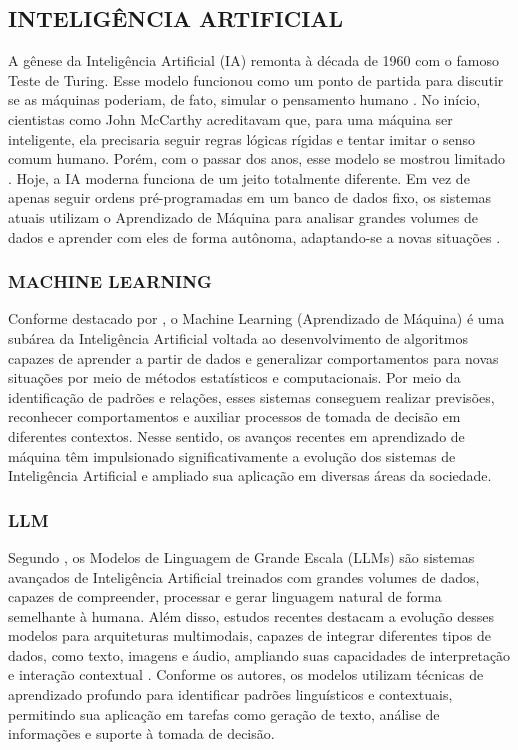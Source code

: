 \documentclass[12pt]{article}
\begin{document}
  \subsection{INTELIGÊNCIA ARTIFICIAL}
  
    A gênese da Inteligência Artificial (IA) remonta à década de 1960 com o famoso Teste de Turing. Esse modelo funcionou como um ponto de partida para discutir se as máquinas poderiam, de fato, simular o pensamento humano \cite{russell2022inteligencia}. No início, cientistas como John McCarthy acreditavam que, para uma máquina ser inteligente, ela precisaria seguir regras lógicas rígidas e tentar imitar o senso comum humano. Porém, com o passar dos anos, esse modelo se mostrou limitado \cite{gabriel2023inteligencia}. Hoje, a IA moderna funciona de um jeito totalmente diferente. Em vez de apenas seguir ordens pré-programadas em um banco de dados fixo, os sistemas atuais utilizam o Aprendizado de Máquina para analisar grandes volumes de dados e aprender com eles de forma autônoma, adaptando-se a novas situações \cite{faceli2025inteligencia}.

    \subsubsection{MACHINE LEARNING}

      Conforme destacado por \cite{barbierato2024challenges}, o Machine Learning (Aprendizado de Máquina) é uma subárea da Inteligência Artificial voltada ao desenvolvimento de algoritmos capazes de aprender a partir de dados e generalizar comportamentos para novas situações por meio de métodos estatísticos e computacionais. Por meio da identificação de padrões e relações, esses sistemas conseguem realizar previsões, reconhecer comportamentos e auxiliar processos de tomada de decisão em diferentes contextos. Nesse sentido, os avanços recentes em aprendizado de máquina têm impulsionado significativamente a evolução dos sistemas de Inteligência Artificial e ampliado sua aplicação em diversas áreas da sociedade.

    \subsubsection{LLM}

      Segundo \cite{minaee2024large}, os Modelos de Linguagem de Grande Escala (LLMs) são sistemas avançados de Inteligência Artificial treinados com grandes volumes de dados, capazes de compreender, processar e gerar linguagem natural de forma semelhante à humana. Além disso, estudos recentes destacam a evolução desses modelos para arquiteturas multimodais, capazes de integrar diferentes tipos de dados, como texto, imagens e áudio, ampliando suas capacidades de interpretação e interação contextual \cite{huang2024from}. Conforme os autores, os modelos utilizam técnicas de aprendizado profundo para identificar padrões linguísticos e contextuais, permitindo sua aplicação em tarefas como geração de texto, análise de informações e suporte à tomada de decisão.
\end{document}
